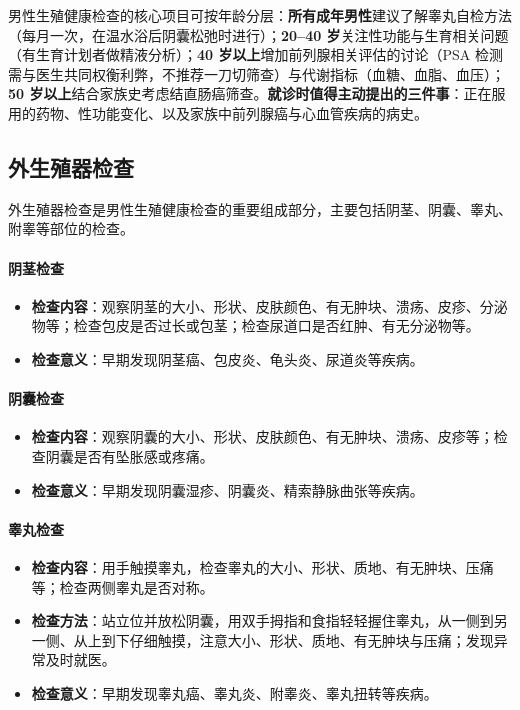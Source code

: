 \documentclass[12pt,a4paper,twoside]{ctexbook}
\begin{document}
男性生殖健康检查的核心项目可按年龄分层：\textbf{所有成年男性}建议了解睾丸自检方法（每月一次，在温水浴后阴囊松弛时进行）；\textbf{20--40 岁}关注性功能与生育相关问题（有生育计划者做精液分析）；\textbf{40 岁以上}增加前列腺相关评估的讨论（PSA 检测需与医生共同权衡利弊，不推荐一刀切筛查）与代谢指标（血糖、血脂、血压）；\textbf{50 岁以上}结合家族史考虑结直肠癌筛查。\textbf{就诊时值得主动提出的三件事}：正在服用的药物、性功能变化、以及家族中前列腺癌与心血管疾病的病史。

\subsection{外生殖器检查}

外生殖器检查是男性生殖健康检查的重要组成部分，主要包括阴茎、阴囊、睾丸、附睾等部位的检查。

\paragraph{阴茎检查}
\begin{itemize}
\item \textbf{检查内容}：观察阴茎的大小、形状、皮肤颜色、有无肿块、溃疡、皮疹、分泌物等；检查包皮是否过长或包茎；检查尿道口是否红肿、有无分泌物等。
\item \textbf{检查意义}：早期发现阴茎癌、包皮炎、龟头炎、尿道炎等疾病。
\end{itemize}

\paragraph{阴囊检查}
\begin{itemize}
\item \textbf{检查内容}：观察阴囊的大小、形状、皮肤颜色、有无肿块、溃疡、皮疹等；检查阴囊是否有坠胀感或疼痛。
\item \textbf{检查意义}：早期发现阴囊湿疹、阴囊炎、精索静脉曲张等疾病。
\end{itemize}

\paragraph{睾丸检查}
\begin{itemize}
\item \textbf{检查内容}：用手触摸睾丸，检查睾丸的大小、形状、质地、有无肿块、压痛等；检查两侧睾丸是否对称。
\item \textbf{检查方法}：站立位并放松阴囊，用双手拇指和食指轻轻握住睾丸，从一侧到另一侧、从上到下仔细触摸，注意大小、形状、质地、有无肿块与压痛；发现异常及时就医。
\item \textbf{检查意义}：早期发现睾丸癌、睾丸炎、附睾炎、睾丸扭转等疾病。
\end{itemize}
\end{document}

